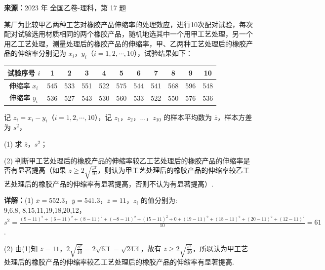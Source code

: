 \begin{question}[points=12]
\textbf{来源：}2023 年 全国乙卷-理科，第 17 题\par
某厂为比较甲乙两种工艺对橡胶产品伸缩率的处理效应，进行10次配对试验，每次配对试验选用材质相同的两个橡胶产品，随机地选其中一个用甲工艺处理，另一个用乙工艺处理，测量处理后的橡胶产品的伸缩率，甲、乙两种工艺处理后的橡胶产品的伸缩率分别记为 $x_i$，$y_i$（$i=1,2,\cdots,10$），试验结果如下：



\begin{tabular}{c|cccccccccc}

试验序号 $i$ & 1 & 2 & 3 & 4 & 5 & 6 & 7 & 8 & 9 & 10 \\ \hline

伸缩率 $x_i$ & 545 & 533 & 551 & 522 & 575 & 544 & 541 & 568 & 596 & 548 \\

伸缩率 $y_i$ & 536 & 527 & 543 & 530 & 560 & 533 & 522 & 550 & 576 & 536 \\

\end{tabular}



记 $z_i=x_i-y_i$（$i=1,2,\cdots,10$），记 $z_1$，$z_2$，$\ldots$，$z_{10}$ 的样本平均数为 $\overline{z}$，样本方差为 $s^2$，



(1) 求 $\overline{z}$，$s^2$；



(2) 判断甲工艺处理后的橡胶产品的伸缩率较乙工艺处理后的橡胶产品的伸缩率是否有显著提高（如果 $\overline{z}\ge 2\sqrt{\frac{s^2}{10}}$，则认为甲工艺处理后的橡胶产品的伸缩率较乙工艺处理后的橡胶产品的伸缩率有显著提高，否则不认为有显著提高）.
\begin{solution}

\textbf{详解：}(1) $\overline{x}=552.3$，$\overline{y}=541.3$，$\overline{z}=11$，$z_i$ 的值分别为: 9,6,8,-8,15,11,19,18,20,12，$s^2=\frac{(9-11)^2+(6-11)^2+(8-11)^2+(-8-11)^2+(15-11)^2+0+(19-11)^2+(18-11)^2+(20-11)^2+(12-11)^2}{10}=61$.

(2) 由(1)知 $\overline{z}=11$，$2\sqrt{\frac{s^2}{10}}=2\sqrt{6.1}=\sqrt{24.4}$，故有 $\overline{z}\ge 2\sqrt{\frac{s^2}{10}}$，所以认为甲工艺处理后的橡胶产品的伸缩率较乙工艺处理后的橡胶产品的伸缩率有显著提高.
\end{solution}
\end{question}


